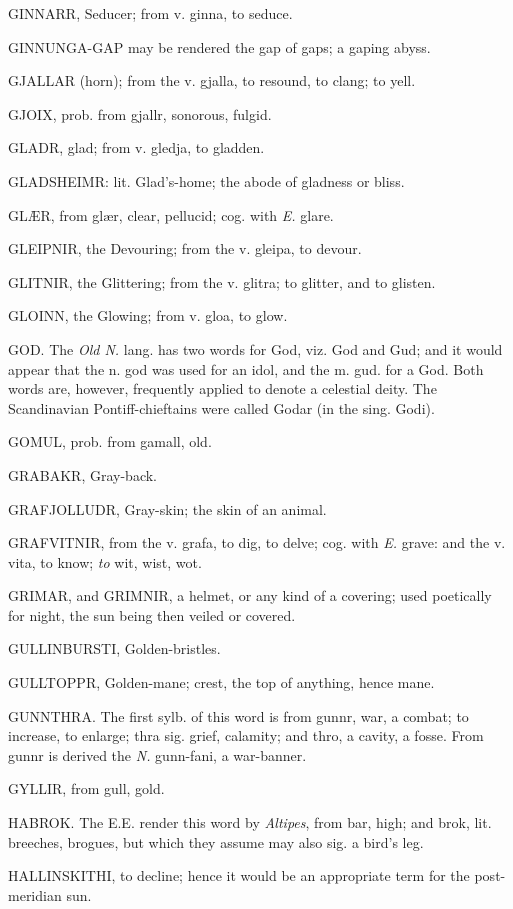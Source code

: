 GINNARR, Seducer; from v. ginna, to seduce.

GINNUNGA-GAP may be rendered the gap of gaps; a gaping abyss.

GJALLAR (horn); from the v. gjalla, to resound, to clang; to yell.

GJOIX, prob. from gjallr, sonorous, fulgid.

GLADR, glad; from v. gledja, to gladden.

GLADSHEIMR: lit. Glad's-home; the abode of gladness or bliss.

GLÆR, from glær, clear, pellucid; cog. with \emph{E.} glare.

GLEIPNIR, the Devouring; from the v. gleipa, to devour.

GLITNIR, the Glittering; from the v. glitra; to glitter, and to
glisten.

GLOINN, the Glowing; from v. gloa, to glow.

GOD. The \emph{Old N.} lang. has two words for God, viz. God and Gud; and
it would appear that the n. god was used for an idol, and the m. gud.
for a God. Both words are, however, frequently applied to denote a
celestial deity. The Scandinavian Pontiff-chieftains were called Godar
(in the sing. Godi).

GOMUL, prob. from gamall, old.

GRABAKR, Gray-back.

GRAFJOLLUDR, Gray-skin; the skin of an animal.

GRAFVITNIR, from the v. grafa, to dig, to delve; cog. with \emph{E.} grave:
and the v. vita, to know; \emph{to} wit, wist, wot.

GRIMAR, and GRIMNIR, a helmet, or any kind of a covering; used
poetically for night, the sun being then veiled or covered.

GULLINBURSTI, Golden-bristles.

GULLTOPPR, Golden-mane; crest, the top of anything, hence mane.

GUNNTHRA. The first sylb. of this word is from gunnr, war, a combat;
to increase, to enlarge; thra sig. grief, calamity; and thro, a
cavity, a fosse. From gunnr is derived the \emph{N.} gunn-fani, a
war-banner.

GYLLIR, from gull, gold.

HABROK. The E.E. render this word by \emph{Altipes}, from bar, high; and
brok, lit. breeches, brogues, but which they assume may also sig. a
bird's leg.

HALLINSKITHI, to decline; hence it would be an appropriate term for
the post-meridian sun.

